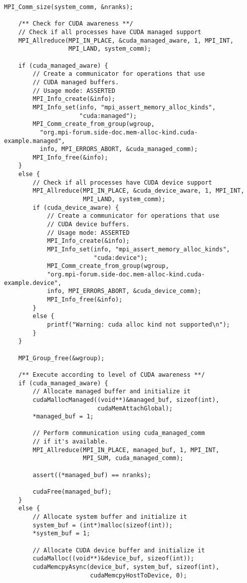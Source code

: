 \begin{example}
\begin{lstlisting}[language={[MPI]C}]
    MPI_Comm_size(system_comm, &nranks);

    /** Check for CUDA awareness **/
    // Check if all processes have CUDA managed support
    MPI_Allreduce(MPI_IN_PLACE, &cuda_managed_aware, 1, MPI_INT,
                  MPI_LAND, system_comm);

    if (cuda_managed_aware) {
        // Create a communicator for operations that use
        // CUDA managed buffers.
        // Usage mode: ASSERTED
        MPI_Info_create(&info);
        MPI_Info_set(info, "mpi_assert_memory_alloc_kinds",
                     "cuda:managed");
        MPI_Comm_create_from_group(wgroup,
          "org.mpi-forum.side-doc.mem-alloc-kind.cuda-example.managed",
          info, MPI_ERRORS_ABORT, &cuda_managed_comm);
        MPI_Info_free(&info);
    }
    else {
        // Check if all processes have CUDA device support
        MPI_Allreduce(MPI_IN_PLACE, &cuda_device_aware, 1, MPI_INT,
                      MPI_LAND, system_comm);
        if (cuda_device_aware) {
            // Create a communicator for operations that use
            // CUDA device buffers.
            // Usage mode: ASSERTED
            MPI_Info_create(&info);
            MPI_Info_set(info, "mpi_assert_memory_alloc_kinds",
                         "cuda:device");
            MPI_Comm_create_from_group(wgroup,
            "org.mpi-forum.side-doc.mem-alloc-kind.cuda-example.device",
            info, MPI_ERRORS_ABORT, &cuda_device_comm);
            MPI_Info_free(&info);
        }
        else {
            printf("Warning: cuda alloc kind not supported\n");
        }
    }

    MPI_Group_free(&wgroup);

    /** Execute according to level of CUDA awareness **/
    if (cuda_managed_aware) {
        // Allocate managed buffer and initialize it
        cudaMallocManaged((void**)&managed_buf, sizeof(int),
                          cudaMemAttachGlobal);
        *managed_buf = 1;

        // Perform communication using cuda_managed_comm
        // if it's available.
        MPI_Allreduce(MPI_IN_PLACE, managed_buf, 1, MPI_INT,
                      MPI_SUM, cuda_managed_comm);

        assert((*managed_buf) == nranks);

        cudaFree(managed_buf);
    }
    else {
        // Allocate system buffer and initialize it
        system_buf = (int*)malloc(sizeof(int));
        *system_buf = 1;

        // Allocate CUDA device buffer and initialize it
        cudaMalloc((void**)&device_buf, sizeof(int));
        cudaMemcpyAsync(device_buf, system_buf, sizeof(int),
                        cudaMemcpyHostToDevice, 0);


\end{lstlisting}
\end{example}
